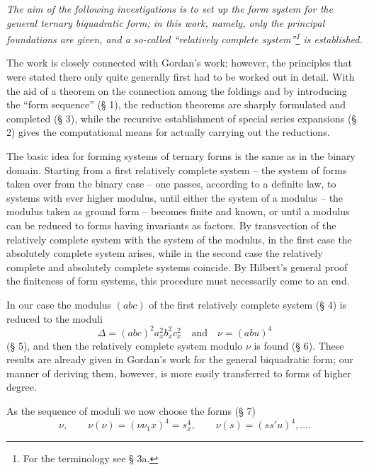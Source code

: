\documentclass[11pt]{article}
\begin{document}
\emph{The aim of the following investigations is to set up the form system for the general ternary biquadratic form; in this work, namely, only the principal foundations are given, and a so-called ``relatively complete system''\footnote{For the terminology see § 3a.} is established.}

The work is closely connected with Gordan's work; however, the principles that were stated there only quite generally first had to be worked out in detail. With the aid of a theorem on the connection among the foldings and by introducing the ``form sequence'' (§ 1), the reduction theorems are sharply formulated and completed (§ 3), while the recursive establishment of special series expansions (§ 2) gives the computational means for actually carrying out the reductions.

The basic idea for forming systems of ternary forms is the same as in the binary domain. Starting from a first relatively complete system -- the system of forms taken over from the binary case -- one passes, according to a definite law, to systems with ever higher modulus, until either the system of a modulus -- the modulus taken as ground form -- becomes finite and known, or until a modulus can be reduced to forms having invariants as factors. By transvection of the relatively complete system with the system of the modulus, in the first case the absolutely complete system arises, while in the second case the relatively complete and absolutely complete systems coincide. By Hilbert's general proof the finiteness of form systems, this procedure must necessarily come to an end.

In our case the modulus $(abc)$ of the first relatively complete system (§ 4) is reduced to the moduli
\[
\Delta=(abc)^2a_x^2b_x^2c_x^2\quad\text{and}\quad \nu=(abu)^4
\]
(§ 5), and then the relatively complete system modulo $\nu$ is found (§ 6). These results are already given in Gordan's work for the general biquadratic form; our manner of deriving them, however, is more easily transferred to forms of higher degree.

As the sequence of moduli we now choose the forms (§ 7)
\[
\nu,\qquad \nu(\nu)=(\nu\nu_1x)^4=s_x^4,\qquad \nu(s)=(ss'u)^4,\ldots .
\]
\end{document}

